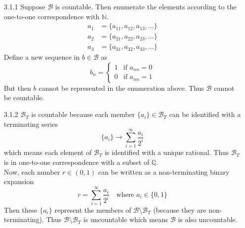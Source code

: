 \documentclass[../../Solutions.tex]{subfiles}
\begin{document}
\begin{itemize}
	\item [3.1.1] Suppose $\mathcal{B}$ is countable.
		Then enumerate the elements according to the one-to-one correspondence with $\mathbb{N}$.
		\begin{equation*} \begin{split}
			a_1 & = \{a_{11},a_{12},a_{13},\dots\} \\
			a_2 & = \{a_{21},a_{22},a_{23},\dots\} \\
			a_3 & = \{a_{31},a_{32},a_{33},\dots\}
		\end{split} \end{equation*}
		Define a new sequence in $b \in \mathcal{B}$ as
		\begin{equation*} b_n = \begin{cases}
			1 & \text{if } a_{nn} = 0 \\
			0 & \text{if } a_{nn} = 1
		\end{cases} \end{equation*}
		But then $b$ cannot be represented in the enumeration above.
		Thus $\mathcal{B}$ cannot be countable.
	
	\item  [3.1.2] $\mathcal{B}_T$ is countable because each member $\{a_i\} \in \mathcal{B}_T$ can be identified with a terminating series
		$$ \{a_i\} \to \sum_{i=1}^\infty \frac{a_i}{2^i} $$
		which means each element of $\mathcal{B}_T$ is identified with a unique rational.
		Thus $\mathcal{B}_T$ is in one-to-one correspondence with a subset of $\mathbb{Q}$. \\
		Now, each number $r \in (0,1)$ can be written as a non-terminating binary expansion
		$$ r = \sum_{i=1}^\infty \frac{a_i}{2^i} \quad\text{where } a_i \in \{0,1\} $$
		Then these $\{a_i\}$ represent the members of $\mathcal{B}\setminus\mathcal{B}_T$ (because they are non-terminating).
		Thus $\mathcal{B}\setminus\mathcal{B}_T$ is uncountable which means $\mathcal{B}$ is also uncountable.
\end{itemize}
\end{document}
